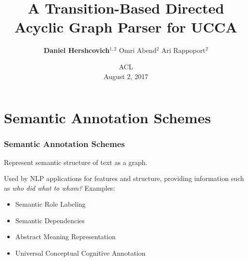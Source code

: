 \documentclass[t]{beamer}
\begin{document}
\title{A Transition-Based Directed Acyclic Graph Parser for UCCA}
\author[Daniel Hershcovich]{\textbf{Daniel Hershcovich}$^{1,2}$ \And Omri Abend$^2$ \And Ari Rappoport$^2$
}
\date{ACL \\ August 2, 2017}

\begin{frame}
\titlepage

\end{frame}



\section{Semantic Annotation Schemes}

\begin{frame}
\frametitle{Semantic Annotation Schemes}
Represent semantic structure of text as a graph.

Used by NLP applications for features and structure,
providing information such as \textit{who did what to whom?}
\vfill
Examples:
\begin{itemize}
 \item Semantic Role Labeling
 \item Semantic Dependencies
 \item Abstract Meaning Representation
 \item Universal Conceptual Cognitive Annotation
\end{itemize}
\end{frame}
\end{document}
